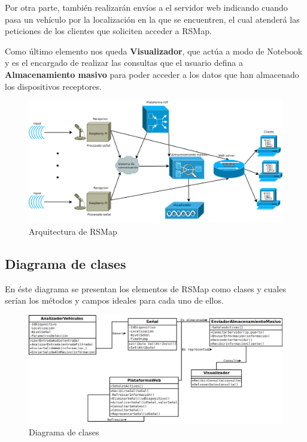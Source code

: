 Por otra parte, también realizarán envíos a el servidor web indicando cuando pasa un vehículo por la localización en la que se encuentren, el cual atenderá las peticiones de los clientes que soliciten acceder a RSMap.

Como último elemento nos queda \textbf{Visualizador}, que actúa a modo de Notebook y es el encargado de realizar las consultas que el usuario defina a \textbf{Almacenamiento masivo} para poder acceder a los datos que han almacenado los dispositivos receptores.

\begin{figure}[!ht]
  \begin{center}
  \includegraphics[scale=0.35]{../images/diag_plan/diag_arqu.png}
  \caption{Arquitectura de RSMap}
  \label{fig:ar_rsmap}
  \end{center}
\end{figure}

\newpage

\subsection{Diagrama de clases}

En éste diagrama se presentan los elementos de RSMap como clases y cuales serían los métodos y campos ideales para cada uno de ellos.

\begin{figure}[!ht]
  \begin{center}
  \includegraphics[scale=0.4]{../images/diag_plan/clases.png}
  \caption{Diagrama de clases}
  \label{fig:ar_rsmap}
  \end{center}
\end{figure}

